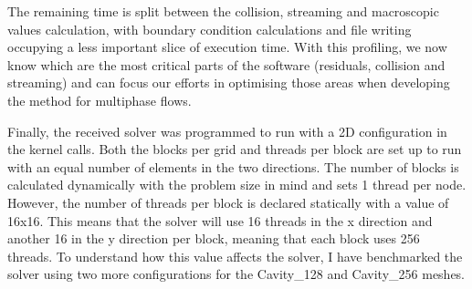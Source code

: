 \documentclass[12pt, openany]{book}
\begin{document}
\par The remaining time is split between the collision, streaming and macroscopic values calculation, with boundary condition calculations and file writing occupying a less important slice of execution time. With this profiling, we now know which are the most critical parts of the software (residuals, collision and streaming) and can focus our efforts in optimising those areas when developing the method for multiphase flows.
\par Finally, the received solver was programmed to run with a 2D configuration in the kernel calls. Both the blocks per grid and threads per block are set up to run with an equal number of elements in the two directions. The number of blocks is calculated dynamically with the problem size in mind and sets 1 thread per node. However, the number of threads per block is declared statically with a value of 16x16. This means that the solver will use 16 threads in the x direction and another 16 in the y direction per block, meaning that each block uses 256 threads. To understand how this value affects the solver, I have benchmarked the solver using two more configurations for the Cavity\_128 and Cavity\_256 meshes.
\end{document}
